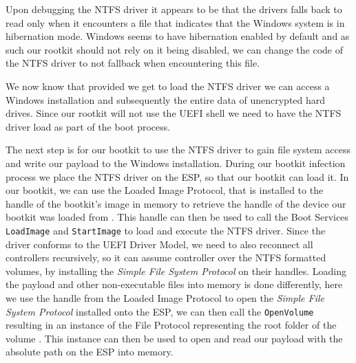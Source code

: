 Upon debugging the \ac{NTFS} driver it appears to be that the drivers falls back to read only when it encounters a file that indicates that the Windows system is in hibernation mode. Windows seems to have hibernation enabled by default and as such our rootkit should not rely on it being disabled, we can change the code of the \ac{NTFS} driver to not fallback when encountering this file.

We now know that provided we get to load the \ac{NTFS} driver we can access a Windows installation and subsequently the entire data of unencrypted hard drives. Since our rootkit will not use the UEFI shell we need to have the NTFS driver load as part of the boot process.

The next step is for our bootkit to use the NTFS driver to gain file system access and write our payload to the Windows installation. During our bootkit infection process we place the NTFS driver on the \ac{ESP}, so that our bootkit can load it. In our bootkit, we can use the Loaded Image Protocol, that is installed to the handle of the bootkit's image in memory to retrieve the handle of the device our bootkit was loaded from \cite[9.1 EFI Loaded Image Protocol]{uefi-spec}. This handle can then be used to call the Boot Services \lstinline{LoadImage} and \lstinline{StartImage} to load and execute the NTFS driver. Since the driver conforms to the UEFI Driver Model, we need to also reconnect all controllers recursively, so it can assume controller over the NTFS formatted volumes, by installing the \emph{Simple File System Protocol} on their handles. Loading the payload and other non-executable files into memory is done differently, here we use the handle from the Loaded Image Protocol to open the \emph{Simple File System Protocol} installed onto the \ac{ESP}, we can then call the \lstinline{OpenVolume} resulting in an instance of the File Protocol representing the root folder of the volume \cite[13.4]{uefi-spec}. This instance can then be used to open and read our payload with the absolute path on the \ac{ESP} into memory.


